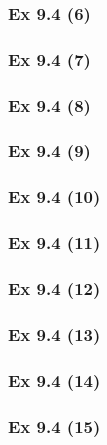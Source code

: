 \subsubsection{Ex 9.4 (6)}\label{sec:Ex_9.4.6}

\subsubsection{Ex 9.4 (7)}\label{sec:Ex_9.4.7}

\subsubsection{Ex 9.4 (8)}\label{sec:Ex_9.4.8}

\subsubsection{Ex 9.4 (9)}\label{sec:Ex_9.4.9}

\subsubsection{Ex 9.4 (10)}\label{sec:Ex_9.4.10}

\newpage		%

\subsubsection{Ex 9.4 (11)}\label{sec:Ex_9.4.11}

\subsubsection{Ex 9.4 (12)}\label{sec:Ex_9.4.12}

\subsubsection{Ex 9.4 (13)}\label{sec:Ex_9.4.13}

\subsubsection{Ex 9.4 (14)}\label{sec:Ex_9.4.14}

\subsubsection{Ex 9.4 (15)}\label{sec:Ex_9.4.15}


